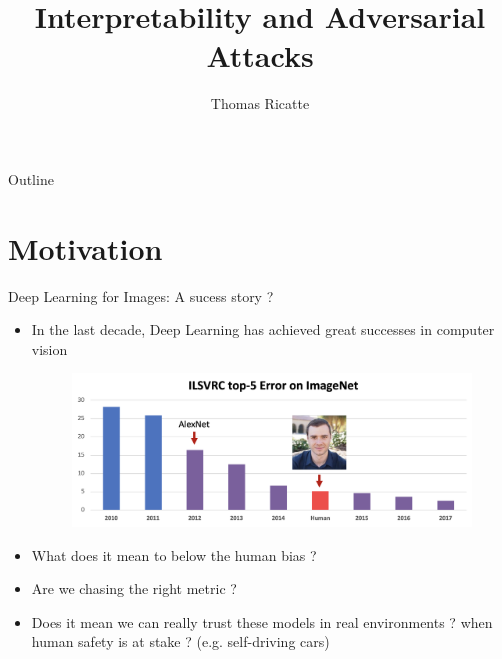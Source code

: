 \documentclass{beamer}
\title{Interpretability and Adversarial Attacks}
\author{Thomas Ricatte}
\begin{document}
\begin{frame} 	 
\titlepage
\end{frame}

\begin{frame}[fragile]{Outline}
  \tableofcontents
\end{frame}

\section{Motivation}

\begin{frame}{Deep Learning for Images: A sucess story ?}

\begin{itemize}
    \item In the last decade, Deep Learning has achieved great successes in computer vision
    
    \begin{figure}[H]
        \centering
        \includegraphics[width=0.8\linewidth]{images/image_net_perf.png}
    \end{figure}
    
    \item What does it mean to below the human bias ?
    \item Are we chasing the right metric ?
    \item Does it mean we can really trust these models in real environments ? when human safety is at stake ? (e.g. self-driving cars)
\end{itemize}
\end{frame}
\end{document}
